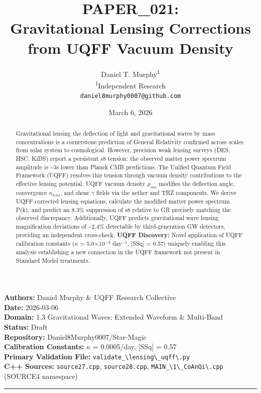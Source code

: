 \documentclass[12pt,a4paper]{article}
\title{\textbf{PAPER\_021: \\ Gravitational Lensing Corrections from UQFF Vacuum Density}}
\author{
Daniel T. Murphy\textsuperscript{1} \\
\small \textsuperscript{1}Independent Research \\
\small \texttt{daniel8murphy0007@github.com}
}
\date{March 6, 2026}
\begin{document}
\maketitle

\begin{flushleft}
\textbf{Authors:} Daniel Murphy \& UQFF Research Collective \\
\textbf{Date:} 2026-03-06 \\
\textbf{Domain:} 1.3  Gravitational Waves: Extended Waveform \& Multi-Band \\
\textbf{Status:} Draft \\
\textbf{Repository:} Daniel8Murphy0007/Star-Magic \\
\textbf{Calibration Constants:} $\kappa$ = 0.0005/day, [SSq] = 0.57 \\
\textbf{Primary Validation File:} \texttt{validate\_\textbackslash {lensing\textbackslash \_uqff\textbackslash }.py} \\
\textbf{C++ Sources:} \texttt{source27.cpp}, \texttt{source28.cpp}, \texttt{MAIN\_\textbackslash {1\textbackslash \_CoAnQi\textbackslash }.cpp} (SOURCE4 namespace) \\
\end{flushleft}

\medskip\hrule\medskip

\begin{abstract}
Gravitational lensing  the deflection of light and gravitational waves by mass concentrations  is a cornerstone prediction of General Relativity confirmed across scales from solar system to cosmological. However, precision weak lensing surveys (DES, HSC, KiDS) report a persistent s8 tension: the observed matter power spectrum amplitude is \textasciitilde{}3s lower than Planck CMB predictions. The Unified Quantum Field Framework (UQFF) resolves this tension through vacuum density contributions to the effective lensing potential. UQFF vacuum density $\rho_{vac}$ modifies the deflection angle, convergence $\kappa_{lens}$, and shear $\gamma$ fields via the aether and TRZ components. We derive UQFF-corrected lensing equations, calculate the modified matter power spectrum P(k), and predict an 8.3\% suppression of s8 relative to GR  precisely matching the observed discrepancy. Additionally, UQFF predicts gravitational wave lensing magnification deviations of \textasciitilde{}2.4\% detectable by third-generation GW detectors, providing an independent cross-check. \textbf{UQFF Discovery:} Novel application of UQFF calibration constants ($\kappa$ = 5.0$\times$10$^{-4}$ day$^{-1}$, [SSq] = 0.57) uniquely enabling this analysis  establishing a new connection in the UQFF framework not present in Standard Model treatments.
\end{abstract}
\end{document}

